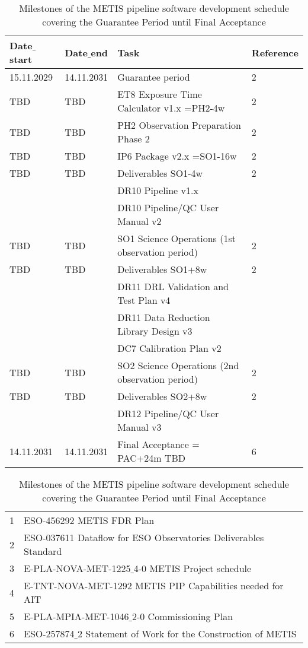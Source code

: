 \begin{table}[h!]
    \caption[Development schedule 3]{Milestones of the METIS pipeline software development schedule covering the Guarantee Period until Final Acceptance}
  \label{tab:development_schedule3}

\centering
\scriptsize
\begin{tabularx}{\textwidth}{llll}

\hline
Date$\_$start &	Date$\_$end   &	Task                            &		Reference \\
\hline\hline
15.11.2029 & 14.11.2031 & Guarantee period 					               & 2 \\
\hline
TBD    & TBD   & ET8 Exposure Time Calculator v1.x =PH2-4w		           & 2 \\
\hline
TBD    & TBD   & PH2 Observation Preparation Phase 2    		           & 2 \\
\hline
TBD    & TBD   & IP6 Package v2.x =SO1-16w				                   & 2 \\
\hline
TBD    & TBD   & Deliverables SO1-4w                                & 2 \\
   &           & DR10 Pipeline v1.x					             &	\\
   &		    & DR10 Pipeline/QC User Manual v2		    	     &	\\
\hline
TBD    & TBD   & SO1 Science Operations (1st observation period) 	& 2 \\
\hline
TBD    & TBD   & Deliverables SO1+8w                                & 2 \\
   &	 	    & DR11 DRL Validation and Test Plan v4	  		     &	\\
   &		    & DR11 Data Reduction Library Design v3	  		     &	\\
   &		    & DC7 Calibration Plan v2					         &	\\
\hline
TBD    & TBD   & SO2 Science Operations (2nd observation period) 	& 2 \\
\hline
TBD    & TBD   & Deliverables SO2+8w                                & 2 \\
   &		    & DR12 Pipeline/QC User Manual v3				     &	\\
\hline
14.11.2031 & 14.11.2031 & Final Acceptance  = PAC+24m  TBD			& 6 \\
\hline\hline
\end{tabularx}			
\tiny
\begin{tabularx}{\textwidth}{ll}
1 & ESO-456292 METIS FDR Plan  \\
2 & ESO-037611 Dataflow for ESO Observatories Deliverables Standard \\
3 & E-PLA-NOVA-MET-1225$\_$4-0 METIS Project schedule \\
4 & E-TNT-NOVA-MET-1292 METIS PIP Capabilities needed for AIT \\ 
5 & E-PLA-MPIA-MET-1046$\_$2-0 Commissioning Plan \\
6 & ESO-257874$\_$2 Statement of Work for the Construction of METIS \\
\end{tabularx} 
\end{table}


